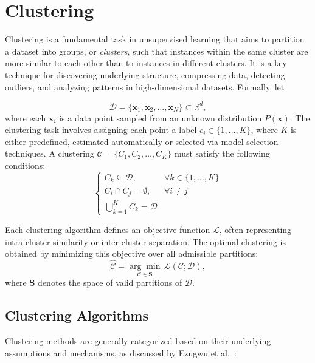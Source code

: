 \section{Clustering}\label{sec:clustering}

Clustering is a fundamental task in unsupervised learning that aims to
partition a dataset into groups, or \textit{clusters}, such that instances
within the same cluster are more similar to each other than to instances in
different clusters. It is a key technique for discovering underlying structure,
compressing data, detecting outliers, and analyzing patterns in
high-dimensional datasets. Formally, let

\begin{equation}
    \mathcal{D} = \{\mathbf{x}_1, \mathbf{x}_2, \ldots, \mathbf{x}_N\} \subset \mathbb{R}^d,
\end{equation}
where each $\mathbf{x}_i$ is a data point sampled from an unknown distribution
$P(\mathbf{x})$. The clustering task involves assigning each point a label $c_i
    \in \{1, \ldots, K\}$, where $K$ is either predefined, estimated automatically
or selected via model selection techniques.
A clustering $\mathcal{C} = \{C_1, C_2, \ldots, C_K\}$
must satisfy the following conditions:
\begin{equation}
    \begin{cases}
        C_k \subseteq \mathcal{D}, & \forall k \in \{1, \ldots, K\} \\
        C_i \cap C_j = \emptyset,  & \forall i \neq j               \\
        \bigcup_{k=1}^{K} C_k = \mathcal{D}
    \end{cases}
\end{equation}

Each clustering algorithm defines an objective function $\mathcal{L}$, often
representing intra-cluster similarity or inter-cluster separation. The optimal
clustering is obtained by minimizing this objective over all admissible
partitions:
\begin{equation}
    \hat{\mathcal{C}} = \underset{\mathcal{C} \in \mathbf{S}}{\arg\min} \, \mathcal{L}(\mathcal{C}; \mathcal{D}),
\end{equation}
where $\mathbf{S}$ denotes the space of valid partitions of $\mathcal{D}$.

\subsection*{Clustering Algorithms}
Clustering methods are generally categorized based on their underlying
assumptions and mechanisms, as discussed by Ezugwu et
al.~\cite{clustering_survey}:

